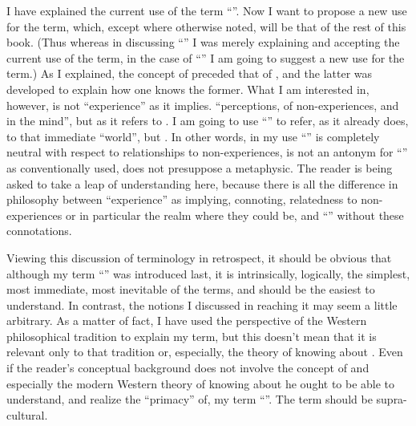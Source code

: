 I have explained the current use of the term \enquote{}. Now I want 
to propose a new use for the term, which, except where otherwise noted, 
will be that of the rest of this book. (Thus whereas in discussing 
\enquote{} I was merely explaining and accepting the current use of 
the term, in the case of \enquote{} I am going to suggest a new use for the 
term.) As I explained, the concept of  preceded that of 
, and the latter was developed to explain how one knows the 
former. What I am interested in, however, is not \enquote{experience} as it implies. 
\enquote{perceptions, of non-experiences, and in the mind}, but as it refers to . I am going to use \enquote{} to refer, as it 
already does, to that immediate \enquote{world}, but . In other words, in my use 
\enquote{} is completely neutral with respect to relationships to 
non-experiences, is not an antonym for \enquote{} as conventionally 
used, does not presuppose a metaphysic. The reader is being asked to take a 
leap of understanding here, because there is all the difference in philosophy 
between \enquote{experience} as implying, connoting, relatedness to non-experiences 
or in particular the realm where they could be, and \enquote{} without 
these connotations. 

Viewing this discussion of terminology in retrospect, it should be 
obvious that although my term \enquote{} was introduced last, it is 
intrinsically, logically, the simplest, most immediate, most inevitable of the 
terms, and should be the easiest to understand. In contrast, the notions I 
discussed in reaching it may seem a little arbitrary. As a matter of fact, I 
have used the perspective of the Western philosophical tradition to explain my 
term, but this doesn't mean that it is relevant only to that tradition or, 
especially, the theory of knowing about . Even if the reader's 
conceptual background does not involve the concept of  and 
especially the modern Western theory of knowing about  he 
ought to be able to understand, and realize the \enquote{primacy} of, my term 
\enquote{}. The term should be supra-cultural. 

